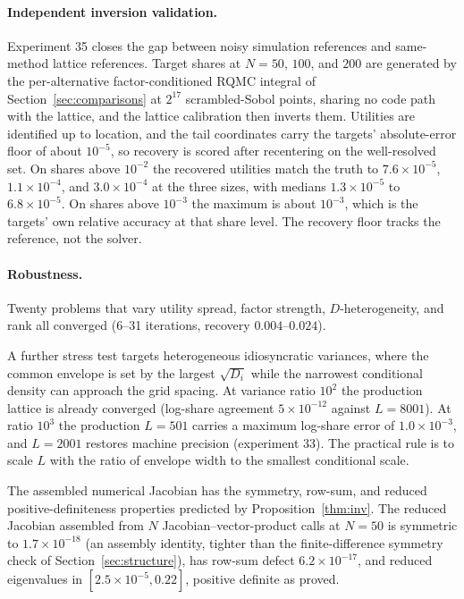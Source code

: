 \documentclass[12pt]{article}
\theoremstyle{remark}
\begin{document}
\paragraph{Independent inversion validation.} Experiment 35 closes the
gap between noisy simulation references and same-method lattice
references. Target shares at $N = 50$, $100$, and $200$ are generated
by the per-alternative factor-conditioned RQMC integral of
Section~\ref{sec:comparisons} at $2^{17}$ scrambled-Sobol points,
sharing no code path with the lattice, and the lattice calibration then
inverts them. Utilities are identified up to location, and the tail
coordinates carry the targets' absolute-error floor of about $10^{-5}$,
so recovery is scored after recentering on the well-resolved set. On
shares above $10^{-2}$ the recovered utilities match the truth to
$7.6\times10^{-5}$, $1.1\times10^{-4}$, and $3.0\times10^{-4}$ at the
three sizes, with medians $1.3\times10^{-5}$ to $6.8\times10^{-5}$. On
shares above $10^{-3}$ the maximum is about $10^{-3}$, which is the
targets' own relative accuracy at that share level. The recovery floor
tracks the reference, not the solver.

\paragraph{Robustness.} Twenty problems that vary utility spread, factor
strength, $D$-heterogeneity, and rank all converged (6--31 iterations, recovery
$0.004$--$0.024$).

A further stress test targets heterogeneous idiosyncratic variances,
where the common envelope is set by the largest $\sqrt{D_i}$ while the
narrowest conditional density can approach the grid spacing. At
variance ratio $10^2$ the production lattice is already converged
(log-share agreement $5\times10^{-12}$ against $L = 8001$). At ratio
$10^3$ the production $L = 501$ carries a maximum log-share error of
$1.0\times10^{-3}$, and $L = 2001$ restores machine precision
(experiment 33). The practical rule is to scale $L$ with the ratio of
envelope width to the smallest conditional scale.

The assembled numerical Jacobian has the symmetry, row-sum, and
reduced positive-definiteness properties predicted by
Proposition~\ref{thm:inv}. The reduced Jacobian assembled from $N$
Jacobian--vector-product calls
at $N=50$ is symmetric to $1.7\times10^{-18}$ (an assembly identity,
tighter than the finite-difference symmetry check of
Section~\ref{sec:structure}), has row-sum defect
$6.2\times10^{-17}$, and reduced eigenvalues in $[2.5\times10^{-5},
0.22]$, positive definite as proved.
\end{document}
